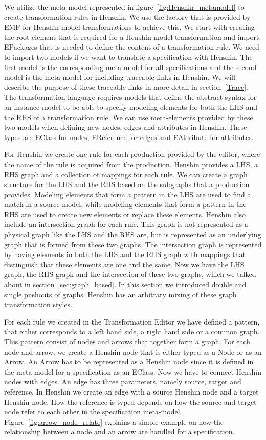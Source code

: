 We utilize the meta-model represented in figure~\ref{fig:Henshin_metamodel} to
create transformation rules in Henshin.  We use the factory that is provided by
EMF for Henshin model transformations to achieve this.
We start with creating the root element that is required for a Henshin model
transformation and import EPackages that is needed to define the content of a
transformation rule. We need to import two models if we want to translate a
specification with Henshin. The first model is the corresponding meta-model for
all specifications and the second model is the meta-model for including
traceable links in Henshin. We will describe the purpose of these traceable
links in more detail in section~\ref{Trace}. The transformation language
requires models that define the abstract syntax for an instance model to be able to
specify modeling elements for both the LHS and the RHS of a transformation
rule. We can use meta-elements provided by these two models when defining new
nodes, edges and attributes in Henshin. These types are EClass for nodes,
EReference for edges and EAttribute for attributes. 

For Henshin we create one rule for each production provided by the editor, where
the name of the rule is acquired from the production. Henshin
provides a LHS, a RHS graph and a collection of mappings for each rule. We can
create a graph structure for the LHS and the RHS based on the subgraphs that a
production provides. Modeling elements that form a pattern in the LHS are used
to find a match in a source model, while modeling elements that form a pattern
in the RHS are used to create new elements or replace these elements. Henshin
also include an intersection graph for each rule. This graph is not represented
as a physical graph like the LHS and the RHS are, but is represented as an
underlying graph that is formed from these two graphs. The intersection graph is
represented by having elements in both the LHS and the RHS graph with mappings
that distinguish that these elements are one and the same. Now we have the LHS
graph, the RHS graph and the intersection of these two graphs, which we talked
about in section~\ref{sec:graph_based}. In this section we introduced double
and single pushouts of graphs. Henshin has an arbitrary mixing of these graph
transformation styles.

For each rule we created in the Transformation Editor we have defined a
pattern, that either corresponds to a left hand side, a right hand side or a
common graph. This pattern consist of nodes and arrows that together form a
graph. For each node and arrow, we create a Henshin node that is either typed
as a Node or as an Arrow. An Arrow has to be represented as a Henshin node since
it is defined in the meta-model for a specification as an EClass. Now we have to
connect Henshin nodes with edges. An edge has three parameters, namely source,
target and reference. In Henshin we create an edge with a source Henshin node
and a target Henshin node. How the reference is typed depends on how the
source and target node refer to each other in the specification meta-model.
Figure~\ref{fig:arrow_node_relate} explains a simple example on how
the relationship between a node and an arrow are handled for a specification.

